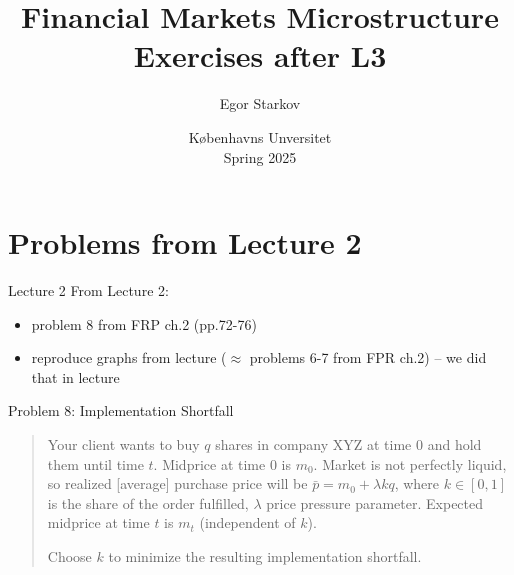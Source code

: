 \documentclass[english,10pt
,aspectratio=169
]{beamer}
\title{Financial Markets Microstructure \\ Exercises after L3}
\author{Egor Starkov}
\date{K{\o}benhavns Unversitet \\
	Spring 2025}
\begin{document}

\frame[plain]{\titlepage}



\section{Problems from Lecture 2}

\begin{frame}{Lecture 2}
From Lecture 2: 
\begin{itemize}
	\item problem 8 from FRP ch.2 (pp.72-76)
	\item reproduce graphs from lecture ($\approx$ problems 6-7 from FPR ch.2) -- we did that in lecture
\end{itemize}
\end{frame}


%
%
%	
%
%


\begin{frame}{Problem 8: Implementation Shortfall}
	\begin{quotation}
		Your client wants to buy $q$ shares in company XYZ at time $0$ and hold them until time $t$. Midprice at time $0$ is $m_0$. Market is not perfectly liquid, so realized [average] purchase price will be $\bar{p} = m_0 + \lambda k q$, where $k \in [0,1]$ is the share of the order fulfilled, $\lambda$ price pressure parameter. Expected midprice at time $t$ is $m_t$ (independent of $k$).
		
		Choose $k$ to minimize the resulting implementation shortfall.
	\end{quotation}
\end{frame}
\end{document}
